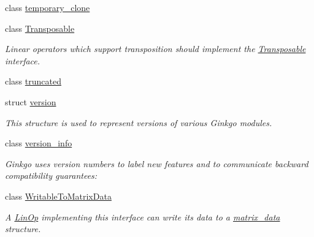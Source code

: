 \begin{DoxyCompactItemize}
class \hyperlink{classgko_1_1temporary__clone}{temporary\+\_\+clone}
\item 
class \hyperlink{classgko_1_1Transposable}{Transposable}
\begin{DoxyCompactList}\small\item\em Linear operators which support transposition should implement the \hyperlink{classgko_1_1Transposable}{Transposable} interface. \end{DoxyCompactList}\item 
class \hyperlink{classgko_1_1truncated}{truncated}
\item 
struct \hyperlink{structgko_1_1version}{version}
\begin{DoxyCompactList}\small\item\em This structure is used to represent versions of various Ginkgo modules. \end{DoxyCompactList}\item 
class \hyperlink{classgko_1_1version__info}{version\+\_\+info}
\begin{DoxyCompactList}\small\item\em Ginkgo uses version numbers to label new features and to communicate backward compatibility guarantees\+: \end{DoxyCompactList}\item 
class \hyperlink{classgko_1_1WritableToMatrixData}{Writable\+To\+Matrix\+Data}
\begin{DoxyCompactList}\small\item\em A \hyperlink{classgko_1_1LinOp}{Lin\+Op} implementing this interface can write its data to a \hyperlink{structgko_1_1matrix__data}{matrix\+\_\+data} structure. \end{DoxyCompactList}\end{DoxyCompactItemize}
